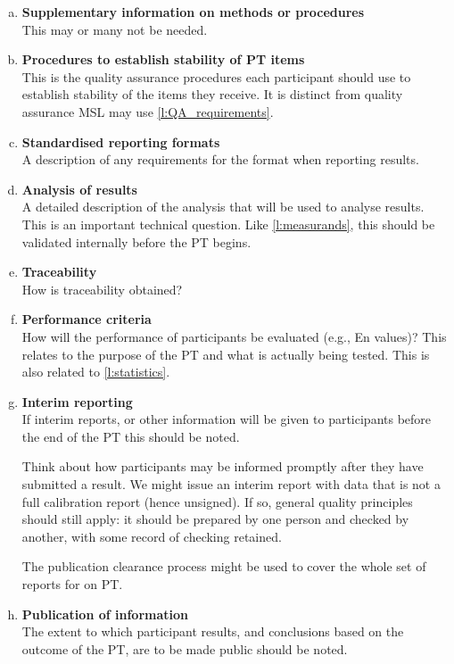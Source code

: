 \begin{enumerate}[a)]
\item	\textbf{Supplementary information on methods or procedures} \\
This may or many not be needed.

\item	\textbf{Procedures to establish stability of PT items} \\ \label{l:stability}%
This is the quality assurance procedures each participant should use to establish stability of the items they receive. It is distinct from quality assurance MSL may use \ref{l:QA_requirements}.

\item	\textbf{Standardised reporting formats} \\
A description of any requirements for the format when reporting results. 

\item	\textbf{Analysis of results} \\ \label{l:statistics}%
A detailed description of the analysis that will be used to analyse results.
This is an important technical question. Like \ref{l:measurands}, this should be validated internally before the PT begins.

\item	\textbf{Traceability} \\
How is traceability obtained?

\item	\textbf{Performance criteria} \\
How will the performance of participants be evaluated (e.g., En values)? This relates to the purpose of the PT and what is actually being tested. This is also related to \ref{l:statistics}. 


\item	\textbf{Interim reporting} \\
If interim reports, or other information will be given to participants before the end of the PT this should be noted. 

Think about how participants may be informed promptly after they have submitted a result. We might issue an interim report with data that is not a full calibration report (hence unsigned). If so, general quality principles should still apply: it should be prepared by one person and checked by another, with some record of checking retained. 

The publication clearance process might be used to cover the whole set of reports for on PT. 

\item	\textbf{Publication of information} \\
The extent to which participant results, and conclusions based on the outcome of the PT, are to be made public should be noted. 


\end{enumerate}
